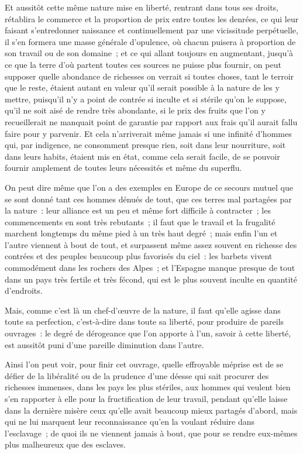 \documentclass[french,twoside]{book} %
\begin{document}
Et aussitôt cette même nature mise en liberté, rentrant dans tous ses droits, rétablira le commerce et la proportion de prix entre toutes les denrées, ce qui leur faisant s’entredonner naissance et continuellement par une vicissitude perpétuelle, il s’en formera une masse générale d’opulence, où chacun puisera à proportion de son travail ou de son domaine ; et ce qui allant toujours en augmentant, jusqu’à ce que la terre d’où partent toutes ces sources ne puisse plus fournir, on peut supposer quelle abondance de richesses on verrait si toutes choses, tant le terroir que le reste, étaient autant en valeur qu’il serait possible à la nature de les y mettre, puisqu’il n’y a point de contrée si inculte et si stérile qu’on le suppose, qu’il ne soit aisé de rendre très abondante, si le prix des fruits que l’on y recueillerait ne manquait point de garantie par rapport aux frais qu’il aurait fallu faire pour y parvenir. Et cela n’arriverait même jamais si une infinité d’hommes qui, par indigence, ne consomment presque rien, soit dans leur nourriture, soit dans leurs habits, étaient mis en état, comme cela serait facile, de se pouvoir fournir amplement de toutes leurs nécessités et même du superflu.\par
On peut dire même que l’on a des exemples en Europe de ce secours mutuel que se sont donné tant ces hommes dénués de tout, que ces terres mal partagées par la nature : leur alliance est un peu et même fort difficile à contracter ; les commencements en sont très rebutants ; il faut que le travail et la frugalité marchent longtemps du même pied à un très haut degré ; mais enfin l’un et l’autre viennent à bout de tout, et surpassent même assez souvent en richesse des contrées et des peuples beaucoup plus favorisés du ciel : les barbets vivent commodément dans les rochers des Alpes ; et l’Espagne manque presque de tout dans un pays très fertile et très fécond, qui est le plus souvent inculte en quantité d’endroits.\par
Mais, comme c’est là un chef-d’œuvre de la nature, il faut qu’elle agisse dans toute sa perfection, c’est-à-dire dans toute sa liberté, pour produire de pareils ouvrages : le degré de dérogeance que l’on apporte à l’un, savoir à cette liberté, est aussitôt puni d’une pareille diminution dans l’autre.\par
Ainsi l’on peut voir, pour finir cet ouvrage, quelle effroyable méprise est de se défier de la libéralité ou de la prudence d’une déesse qui sait procurer des richesses immenses, dans les pays les plus stériles, aux hommes qui veulent bien s’en rapporter à elle pour la fructification de leur travail, pendant qu’elle laisse dans la dernière misère ceux qu’elle avait beaucoup mieux partagés d’abord, mais qui ne lui marquent leur reconnaissance qu’en la voulant réduire dans l’esclavage ; de quoi ils ne viennent jamais à bout, que pour se rendre eux-mêmes plus malheureux que des esclaves.\par
\end{document}
